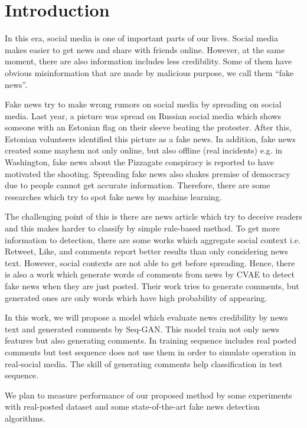 \section{Introduction}
In this era, social media is one of important parts of our lives.
Social media makes easier to get news and share with friends online.
However, at the same moment, 
there are also information includes less credibility.
Some of them have obvious misinformation that are made by malicious purpose,
we call them ``fake news''.

Fake news try to make wrong rumors on social media by spreading on social media.
Last year, a picture was spread on Russian social media which shows someone with an Estonian flag on their sleeve beating the protester.
After this, Estonian volunteers identified this picture as a fake news\cite{vaikmaa_2019}.
In addition, fake news created some mayhem not only online, but also offline (real incidents)
e.g. in Washington, fake news about the Pizzagate conspiracy is reported to have motivated the shooting\cite{agencies_2016}.
Spreading fake news also shakes premise of democracy due to people cannot get accurate information.
Therefore, there are some researches which try to spot fake news by machine learning.

The challenging point of this is there are news article which try to deceive readers
and this makes harder to classify by simple rule-based method.
To get more information to detection,
there are some works which aggregate social context i.e. Retweet, Like, and comments
report better results than only considering news text\cite{Guo:2018:RDH:3269206.3271709}.
However, social contexts are not able to get before spreading.
Hence, there is also a work which generate words of comments from news by CVAE to detect fake news when they are just posted\cite{ijcai2018-533}.
Their work tries to generate comments, but generated ones are only words which have high probability of appearing.

In this work, we will propose a model which evaluate news credibility by news text and generated comments by Seq-GAN\cite{Yu:2017:SSG:3298483.3298649}.
This model train not only news features but also generating comments.
In training sequence includes real posted comments but test sequence does not use them in order to simulate operation in real-social media.
The skill of generating comments help classification in test sequence.

We plan to measure performance of our proposed method by some experiments with real-posted dataset and some state-of-the-art fake news detection algorithms.
